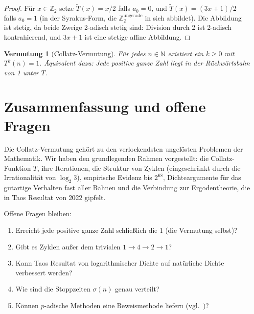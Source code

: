 \documentclass[12pt,a4paper]{article}
\newtheorem{conjecture}[theorem]{Vermutung}
\begin{document}
\begin{proof}
Für $x \in \mathbb{Z}_2$ setze $\tilde{T}(x) = x/2$ falls $a_0 = 0$, und
$\tilde{T}(x) = (3x+1)/2$ falls $a_0 = 1$ (in der Syrakus-Form, die
$\mathbb{Z}_2^{\text{ungerade}}$ in sich abbildet). Die Abbildung ist stetig, da
beide Zweige 2-adisch stetig sind: Division durch 2 ist 2-adisch kontrahierend,
und $3x+1$ ist eine stetige affine Abbildung.
\end{proof}

\begin{conjecture}[Collatz-Vermutung]\label{conj:collatz}
Für jedes $n \in \mathbb{N}$ existiert ein $k \geq 0$ mit $T^k(n) = 1$.
Äquivalent dazu: Jede positive ganze Zahl liegt in der Rückwärtsbahn von 1 unter $T$.
\end{conjecture}

\section{Zusammenfassung und offene Fragen}

Die Collatz-Vermutung gehört zu den verlockendsten ungelösten Problemen der Mathematik.
Wir haben den grundlegenden Rahmen vorgestellt: die Collatz-Funktion $T$, ihre Iterationen,
die Struktur von Zyklen (eingeschränkt durch die Irrationalität von $\log_2 3$), empirische
Evidenz bis $2^{68}$, Dichteargumente für das gutartige Verhalten fast aller Bahnen und die
Verbindung zur Ergodentheorie, die in Taos Resultat von 2022 gipfelt.

Offene Fragen bleiben:
\begin{enumerate}
  \item Erreicht jede positive ganze Zahl schließlich die 1 (die Vermutung selbst)?
  \item Gibt es Zyklen außer dem trivialen $1 \to 4 \to 2 \to 1$?
  \item Kann Taos Resultat von logarithmischer Dichte auf natürliche Dichte verbessert werden?
  \item Wie sind die Stoppzeiten $\sigma(n)$ genau verteilt?
  \item Können $p$-adische Methoden eine Beweismethode liefern (vgl.\ \cite{Fuhrmann2026b})?
\end{enumerate}
\end{document}
